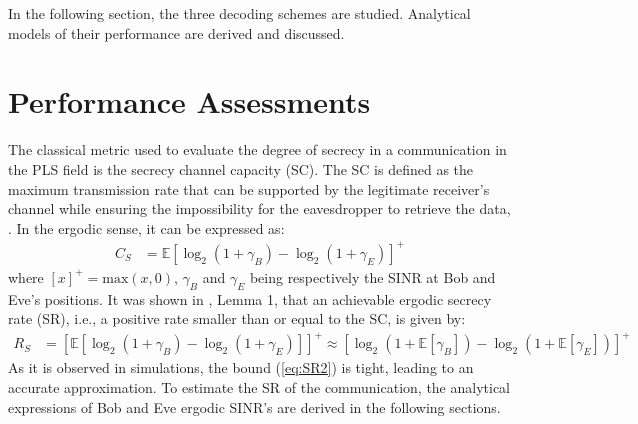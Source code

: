 \documentclass[12pt, draftclsnofoot, onecolumn]{IEEEtran}
\let\MYoriglatexcaption\caption
\renewcommand{\caption}[2][\relax]{\MYoriglatexcaption[#2]{#2}}
\newcommand{\EX}[1]{\mathbb{E} \left[#1\right]}%
\begin{document}
In the following section, the three decoding schemes are studied. Analytical models of their performance are derived and discussed.




%
%
%










\section{Performance Assessments}
\label{sec:perf}
The classical metric used to evaluate the degree of secrecy in a communication in the PLS field is the secrecy channel capacity (SC). The SC is defined as the maximum transmission rate that can be supported by the legitimate receiver's channel while ensuring the impossibility for the eavesdropper to retrieve the data, \cite{7348007}. In the ergodic sense, it can be expressed as:
\begin{equation}
\begin{split}
C_S &=  \EX{\log_2{\left(1+\gamma_B\right)} - \log_2{\left(1+\gamma_E\right)}}^+ 
\end{split}
\label{eq:SR}
\end{equation}
where $\left[x\right]^+ = \text{max}(x,0)$,  $\gamma_B$ and $\gamma_E$ being respectively the SINR at Bob and Eve's positions.  It was shown in \cite{8418798}, Lemma 1, that an achievable ergodic secrecy rate (SR), i.e., a positive rate smaller than or equal to the SC, is given by:
\begin{equation}
	\begin{split}
		R_S& = \left[\EX{\log_2(1+\gamma_B)-\log_2(1+\gamma_E)}\right]^+ \approx \left[ \log_2(1 + \EX{\gamma_B}) - \log_2(1 + \EX{\gamma_E})\right]^+
	\end{split}
	\label{eq:SR2}
\end{equation}
As it is observed in simulations, the bound (\ref{eq:SR2}) is tight, leading to an accurate approximation. To estimate the SR of the communication, the analytical expressions of Bob and Eve ergodic SINR's are derived in the following sections.
\end{document}
